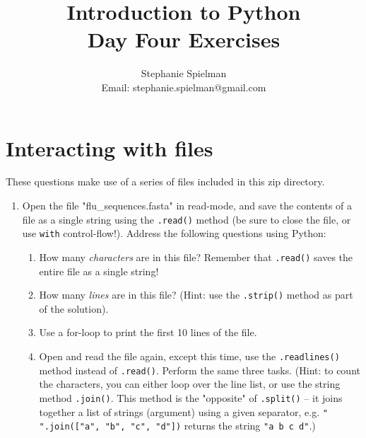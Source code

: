 \documentclass{article}[12pt]
\newcommand{\code}[1]{\texttt{#1}}  %
\begin{document}
\title{Introduction to Python \\ Day Four Exercises}
\author{Stephanie Spielman \\ \footnotesize{Email: stephanie.spielman@gmail.com}}
\date{}
\maketitle{}


\section{Interacting with files}

These questions make use of a series of files included in this zip directory. 

\begin{enumerate}[itemsep=5ex]
	
	\item Open the file "flu\_sequences.fasta" in read-mode, and save the contents of a file as a single string using the \code{.read()} method (be sure to close the file, or use \code{with} control-flow!). Address the following questions using Python:
	
	\begin{enumerate}[itemsep=2ex]
		\item How many \emph{characters} are in this file? Remember that \code{.read()} saves the entire file as a single string!
		\item How many \emph{lines} are in this file? (Hint: use the \code{.strip()} method as part of the solution).
		\item Use a for-loop to print the first 10 lines of the file.
		\item Open and read the file again, except this time, use the \code{.readlines()} method instead of \code{.read()}. Perform the same three tasks. (Hint: to count the characters, you can either loop over the line list, or use the string method \code{.join()}. This method is the "opposite" of \code{.split()} -- it joins together a list of strings (argument) using a given separator, e.g. \code{" ".join(["a", "b", "c", "d"])} returns the string \code{"a b c d"}.)
	\end{enumerate}
	

\end{enumerate}
\end{document}
